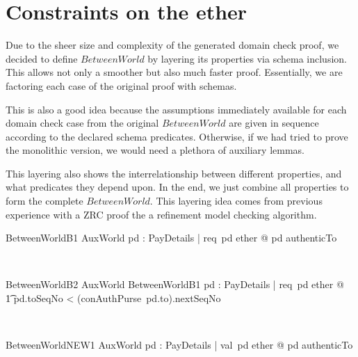 \section{Constraints on the ether}\label{ch5.betweenworld}

Due to the sheer size and complexity of the generated domain check proof,
we decided to define $BetweenWorld$ by layering its properties via schema
inclusion. This allows not only a smoother but also much faster proof.
Essentially, we are factoring each case of the original proof with schemas.

This is also a good idea because the assumptions immediately available for
each domain check case from the original $BetweenWorld$ are given
in sequence according to the declared schema predicates. Otherwise, if we
had tried to prove the monolithic version, we would need a plethora of auxiliary
lemmas.

This layering also shows the interrelationship between different properties,
and what predicates they depend upon. In the end, we just combine all properties
to form the complete $BetweenWorld$. This layering idea comes from previous
experience with a ZRC proof the a refinement model checking algorithm.

\begin{LNewSDef}
\begin{schema}{BetweenWorldB1}
   AuxWorld
\where
   \forall pd : PayDetails | req~pd \in ether @ pd \in authenticTo
\end{schema}~\end{LNewSDef}

\begin{LNewSDef}
\begin{schema}{BetweenWorldB2}
   AuxWorld
\where
   BetweenWorldB1
   \also
   \forall pd : PayDetails | req~pd \in ether @
  \\ %
  \t1 pd.toSeqNo < (conAuthPurse~pd.to).nextSeqNo
\end{schema}~\end{LNewSDef}

\begin{LNewSDef}
\begin{schema}{BetweenWorldNEW1}
   AuxWorld
\where
   \forall pd : PayDetails | val~pd \in ether @ pd \in authenticTo
\end{schema}~\end{LNewSDef}

